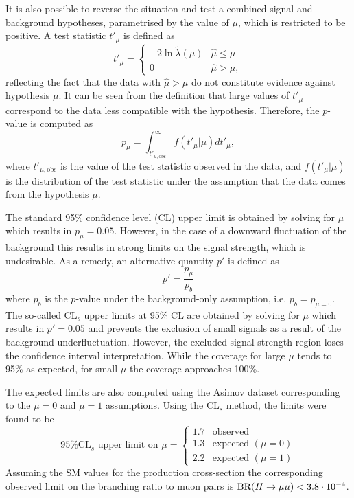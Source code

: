 It is also possible to reverse the situation and test a combined signal
and background hypotheses, parametrised by the value of $\mu$, which is
restricted to be positive. A test statistic $t'_\mu$ is defined as
\begin{equation}
t'_\mu =
    \begin{cases}
     -2\ln{\tilde\lambda(\mu)} & \hat\mu \leq \mu \\
     0                         & \hat\mu > \mu,
    \end{cases}
\end{equation}
reflecting the fact that the data with $\hat\mu > \mu$ do not constitute
evidence against hypothesis $\mu$. It can be seen from the definition
that large values of $t'_\mu$ correspond to the data less compatible with the
hypothesis. Therefore, the $p$-value is computed as
\begin{equation}
p_\mu = \int_{t'_{\mu, \text{obs}}}^{\infty} f(t'_\mu | \mu) d t'_\mu,
\end{equation}
where $t'_{\mu, \text{obs}}$ is the value of the test statistic observed
in the data, and $f(t'_\mu | \mu)$ is the distribution of the test statistic
under the assumption that the data comes from the hypothesis $\mu$.

The standard 95\% confidence level (CL) upper limit is obtained by solving
for $\mu$ which results in $p_\mu = 0.05$. However, in the case of a downward
fluctuation of the background this results in strong limits on the signal strength,
which is undesirable. As a remedy, an alternative quantity $p'$ is defined as
\begin{equation}
p' = \frac{p_\mu}{p_b}
\end{equation}
where $p_b$ is the $p$-value under the background-only assumption,
i.e.
$p_b = p_{\mu=0}$.
The so-called CL$_s$ upper limits at 95\% CL are obtained by solving for $\mu$ which
results in $p' = 0.05$ \cite{Cowan:2010js, 0954-3899-28-10-313} and
prevents the exclusion of small signals as
a result of the background underfluctuation. However, the excluded signal
strength region loses the confidence interval interpretation. While the
coverage for large $\mu$ tends to 95\% as expected, for small $\mu$ the
coverage approaches 100\%.

The expected limits are also computed using the Asimov dataset
corresponding to the $\mu=0$ and $\mu=1$ assumptions. Using the CL$_s$
method, the limits were found to be
\begin{equation}
\text{95\% CL$_s$ upper limit on $\mu$} =
    \begin{cases}
     1.7 & \text{observed } \\
     1.3 & \text{expected } (\mu = 0) \\
     2.2 & \text{expected } (\mu = 1)
    \end{cases}
\end{equation}
Assuming the SM values for the production cross-section the corresponding
observed limit on the branching ratio to muon pairs is
$\text{BR}(H \rightarrow \mu\mu) < 3.8 \cdot 10^{-4}$.

